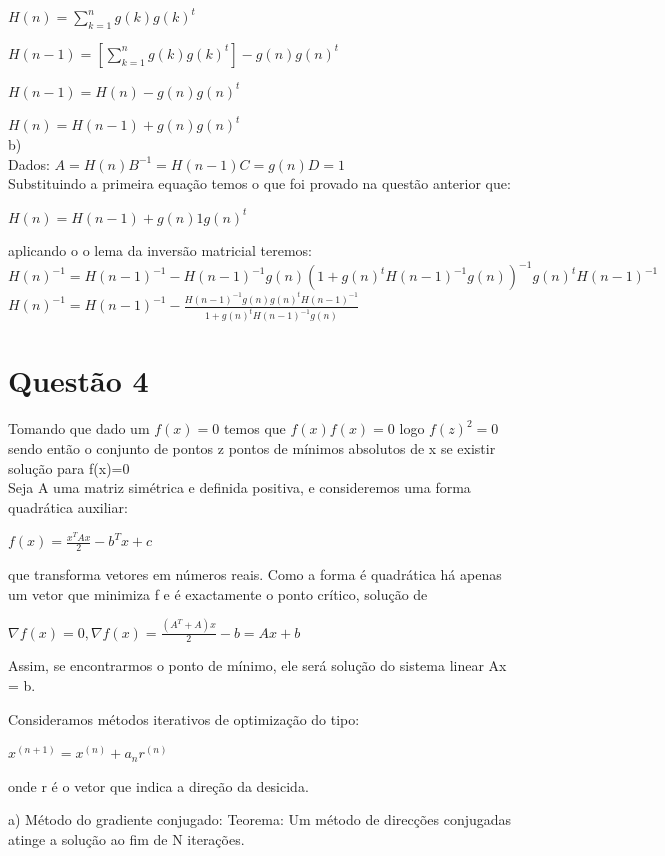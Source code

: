 \documentclass[a4paper, 12pt]{article}
\begin{document}
$H(n) = \sum_{k=1}^{n} g(k)g(k)^t$

$H(n-1) =[ \sum_{k=1}^{n} g(k)g(k)^t] - g(n)g(n)^t$

$H(n-1) = H(n) - g(n)g(n)^t$

$H(n)=H(n-1)+g(n)g(n)^t $ \\

b)\\

Dados: $A=H(n) B^{-1} = H(n-1) C=g(n) D=1 $\\

Substituindo a primeira equação temos o que foi provado na questão anterior que:

$H(n)=H(n-1)+g(n)1g(n)^t $

aplicando o o lema da inversão matricial teremos:\\

$H(n)^{-1} = H(n-1)^{-1} - H(n-1)^{-1} g(n) (1+g(n)^t H(n-1)^{-1}g(n))^{-1}g(n)^t H(n-1)^{-1}$\\

$H(n)^{-1} = H(n-1)^{-1} - \frac{H(n-1)^{-1} g(n)g(n)^t H(n-1)^{-1}}{1+g(n)^t H(n-1)^{-1}g(n)}$

\section{Questão 4}

Tomando que dado um $f(x)=0$ temos que $f(x)f(x)=0$ logo $f(z)^2 = 0$ sendo então o conjunto de pontos z pontos de mínimos absolutos de x se existir solução para f(x)=0
\\
Seja A uma matriz simétrica e definida positiva, e consideremos uma forma quadrática auxiliar:

$f(x)= \frac{x^T Ax}{2} -b^T x + c$

que transforma vetores em números reais. Como a forma é quadrática há apenas um vetor que minimiza f e é exactamente o ponto crítico, solução de

$\nabla f(x) = 0, \nabla f(x)=\frac{(A^T +A)x}{2}-b = Ax+b$

Assim, se encontrarmos o ponto de mínimo, ele será solução do sistema linear Ax = b.

Consideramos métodos iterativos de optimização do tipo:

$x^{(n+1)}=x^{(n)}+a_nr^{(n)}$


onde r é o vetor que indica a direção da desicida.


a) Método do gradiente conjugado:
Teorema: Um método de direcções conjugadas atinge a solução ao fim de N iterações.
\end{document}
